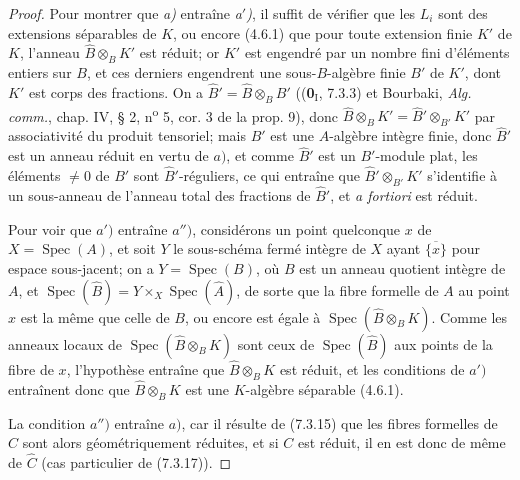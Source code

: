 \begin{proof}
Pour montrer que \emph{a)} entraîne \emph{a$'$)}, il suffit de vérifier que les $L_i$ sont
des extensions séparables de $K$, ou encore (4.6.1) que pour toute extension
finie $K'$ de $K$, l'anneau $\widehat B\otimes_BK'$ est réduit; or $K'$ est
engendré par un nombre fini d'éléments entiers sur $B$, et ces derniers
engendrent une sous-$B$-algèbre finie $B'$ de $K'$, dont $K'$ est corps des
fractions. On a $\widehat{B}'=\widehat B\otimes_BB'$
((\textbf{0}$_{\mathrm I}$, 7.3.3) et Bourbaki, \emph{Alg. comm.}, chap. IV, § 2,
n\textsuperscript{o} 5, cor. 3 de
la prop. 9), donc
$\widehat B\otimes_BK'=\widehat{B}'\otimes_{B'}K'$ par associativité du produit
tensoriel; mais $B'$ est une $A$-algèbre intègre finie, donc $\widehat{B}'$ est
un anneau réduit en vertu de $a)$, et comme $\widehat{B}'$ est un $B'$-module
plat, les éléments $\neq0$ de $B'$ sont $\widehat{B}'$-réguliers, ce qui
entraîne que $\widehat{B}'\otimes_{B'}K'$ s'identifie à un sous-anneau de
l'anneau total des fractions de $\widehat{B}'$, et \emph{a fortiori} est réduit.

Pour voir que $a')$ entraîne $a'')$, considérons un point quelconque $x$ de
$X=\operatorname{Spec}(A)$, et soit $Y$ le sous-schéma fermé intègre de $X$
ayant $\overline{\{x\}}$ pour espace sous-jacent; on a
$Y=\operatorname{Spec}(B)$, où $B$ est un anneau quotient intègre de $A$, et
$\operatorname{Spec}(\widehat B)=Y\times_X\operatorname{Spec}(\widehat A)$,
de sorte que la fibre formelle de $A$ au point $x$ est la même que celle de
$B$, ou encore est égale à $\operatorname{Spec}(\widehat B\otimes_BK)$. Comme
les anneaux locaux de $\operatorname{Spec}(\widehat B\otimes_BK)$ sont ceux de
$\operatorname{Spec}(\widehat B)$ aux points de la fibre de $x$, l'hypothèse
entraîne que $\widehat B\otimes_BK$ est réduit, et les conditions de $a')$
entraînent donc que $\widehat B\otimes_BK$ est une $K$-algèbre séparable
(4.6.1).

La condition $a'')$ entraîne $a)$, car il résulte de (7.3.15) que les fibres
formelles de $C$ sont alors géométriquement réduites, et si $C$ est réduit, il
en est donc de même de $\widehat C$ (cas particulier de (7.3.17)).


\end{proof}
